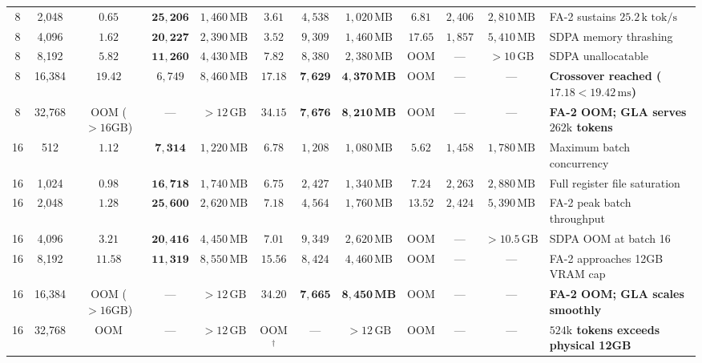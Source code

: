 \begin{table}[t]
{\begin{tabular}{cc ccc ccc ccc l}
8 & 2,048  & $\mathbf{0.65}$ & $\mathbf{25{,}206}$ & $1{,}460\,\text{MB}$ & $3.61$ & $4{,}538$ & $1{,}020\,\text{MB}$ & $6.81$ & $2{,}406$ & $2{,}810\,\text{MB}$ & FA-2 sustains $25.2\,\text{k tok/s}$ \\
8 & 4,096  & $\mathbf{1.62}$ & $\mathbf{20{,}227}$ & $2{,}390\,\text{MB}$ & $3.52$ & $9{,}309$ & $1{,}460\,\text{MB}$ & $17.65$ & $1{,}857$ & $5{,}410\,\text{MB}$ & SDPA memory thrashing \\
8 & 8,192  & $\mathbf{5.82}$ & $\mathbf{11{,}260}$ & $4{,}430\,\text{MB}$ & $7.82$ & $8{,}380$ & $2{,}380\,\text{MB}$ & OOM & — & $>10\,\text{GB}$ & SDPA unallocatable \\
8 & 16,384 & $19.42$         & $6{,}749$          & $8{,}460\,\text{MB}$ & $\mathbf{17.18}$ & $\mathbf{7{,}629}$ & $\mathbf{4{,}370\,\text{MB}}$ & OOM & — & — & \textbf{Crossover reached ($17.18 < 19.42\,\text{ms}$)} \\
8 & 32,768 & OOM ($>16\text{GB}$) & —            & $>12\,\text{GB}$ & $\mathbf{34.15}$ & $\mathbf{7{,}676}$ & $\mathbf{8{,}210\,\text{MB}}$ & OOM & — & — & \textbf{FA-2 OOM; GLA serves $262\text{k}$ tokens} \\
\midrule
16 & 512   & $\mathbf{1.12}$ & $\mathbf{7{,}314}$  & $1{,}220\,\text{MB}$ & $6.78$ & $1{,}208$ & $1{,}080\,\text{MB}$ & $5.62$ & $1{,}458$ & $1{,}780\,\text{MB}$ & Maximum batch concurrency \\
16 & 1,024 & $\mathbf{0.98}$ & $\mathbf{16{,}718}$ & $1{,}740\,\text{MB}$ & $6.75$ & $2{,}427$ & $1{,}340\,\text{MB}$ & $7.24$ & $2{,}263$ & $2{,}880\,\text{MB}$ & Full register file saturation \\
16 & 2,048 & $\mathbf{1.28}$ & $\mathbf{25{,}600}$ & $2{,}620\,\text{MB}$ & $7.18$ & $4{,}564$ & $1{,}760\,\text{MB}$ & $13.52$ & $2{,}424$ & $5{,}390\,\text{MB}$ & FA-2 peak batch throughput \\
16 & 4,096 & $\mathbf{3.21}$ & $\mathbf{20{,}416}$ & $4{,}450\,\text{MB}$ & $7.01$ & $9{,}349$ & $2{,}620\,\text{MB}$ & OOM & — & $>10.5\,\text{GB}$ & SDPA OOM at batch 16 \\
16 & 8,192 & $\mathbf{11.58}$ & $\mathbf{11{,}319}$ & $8{,}550\,\text{MB}$ & $15.56$ & $8{,}424$ & $4{,}460\,\text{MB}$ & OOM & — & — & FA-2 approaches 12GB VRAM cap \\
16 & 16,384 & OOM ($>16\text{GB}$) & —           & $>12\,\text{GB}$ & $\mathbf{34.20}$ & $\mathbf{7{,}665}$ & $\mathbf{8{,}450\,\text{MB}}$ & OOM & — & — & \textbf{FA-2 OOM; GLA scales smoothly} \\
16 & 32,768 & OOM & —                            & $>12\,\text{GB}$ & OOM$^\dagger$ & — & $>12\,\text{GB}$ & OOM & — & — & \textbf{$524\text{k}$ tokens exceeds physical 12GB} \\

\end{tabular}}
\end{table}
